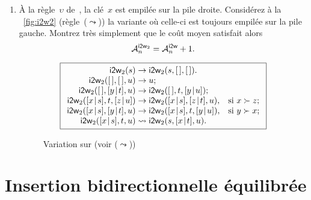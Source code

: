 \begin{enumerate}
  \item À la règle~\(\upsilon\) de~,
    la clé~\(x\) est empilée sur la pile droite. Considérez à la
    \fig~\vref{fig:i2w2} (règle~(\(\leadsto\))) la variante où
    celle-ci est toujours empilée sur la pile gauche. Montrez très
    simplement que le coût moyen satisfait alors
    \begin{equation*}
      \M{\fun{i2w}_2}{n} = \M{\fun{i2w}}{n} + 1.
    \end{equation*}
    \begin{figure}[h]
    \begin{equation*}
      \boxed{%
      \begin{array}{r@{\;}l@{\;}ll}
        \fun{i2w}_2(s)         & \rightarrow
                               & \fun{i2w}_2(s,\el,\el).\\
        \fun{i2w}_2(\el,\el,u) & \rightarrow
                               & u;\\
        \fun{i2w}_2(\el,\cons{y}{t},u)
                               & \rightarrow
                               & \fun{i2w}_2(\el,t,\cons{y}{u});\\
        \fun{i2w}_2(\cons{x}{s},t,\cons{z}{u})
                               & \rightarrow
                               & \fun{i2w}_2(\cons{x}{s},\cons{z}{t},u),
                               & \text{si \(x \succ z\)};\\
        \fun{i2w}_2(\cons{x}{s},\cons{y}{t},u)
                               & \rightarrow
                               & \fun{i2w}_2(\cons{x}{s},t,\cons{y}{u}),
                               & \text{si \(y \succ x\)};\\
        \fun{i2w}_2(\cons{x}{s},t,u)
                               & \leadsto
                               & \fun{i2w}_2(s,\cons{x}{t},u).
      \end{array}}
    \end{equation*}
    \caption{Variation  sur  (voir (\(\leadsto\)))}
    \label{fig:i2w2}
    \end{figure}

\end{enumerate}

\section{Insertion bidirectionnelle équilibrée}

